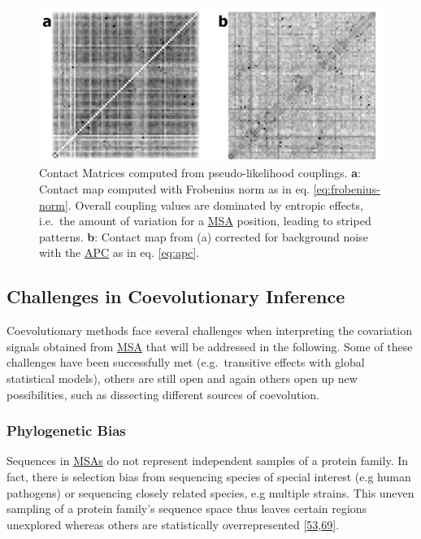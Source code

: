 \documentclass[12pt,a4paper,twoside]{book}
\theoremstyle{definition}
\theoremstyle{definition}
\theoremstyle{remark}
\begin{document}
\begin{figure}
\includegraphics[width=1\linewidth]{img/intro/apc_correction_transparent} \caption{Contact Matrices computed from
pseudo-likelihood couplings. \textbf{a}: Contact map computed with
Frobenius norm as in eq. \eqref{eq:frobenius-norm}. Overall coupling
values are dominated by entropic effects, i.e.~the amount of variation
for a \protect\hyperlink{abbrev}{MSA} position, leading to striped
patterns. \textbf{b}: Contact map from (a) corrected for background
noise with the \protect\hyperlink{abbrev}{APC} as in eq. \eqref{eq:apc}.}\label{fig:apc-correction}
\end{figure}

\subsection{Challenges in Coevolutionary Inference}\label{challenges}

Coevolutionary methods face several challenges when interpreting the
covariation signals obtained from \protect\hyperlink{abbrev}{MSA} that
will be addressed in the following. Some of these challenges have been
successfully met (e.g.~transitive effects with global statistical
models), others are still open and again others open up new
possibilities, such as dissecting different sources of coevolution.

\subsubsection*{Phylogenetic Bias}\label{phylogenetic-bias}

Sequences in \protect\hyperlink{abbrev}{MSAs} do not represent
independent samples of a protein family. In fact, there is selection
bias from sequencing species of special interest (e.g human pathogens)
or sequencing closely related species, e.g multiple strains. This uneven
sampling of a protein family's sequence space thus leaves certain
regions unexplored whereas others are statistically overrepresented
{[}\protect\hyperlink{ref-Morcos2011}{53},\protect\hyperlink{ref-Marks2012}{69}{]}.
\end{document}
